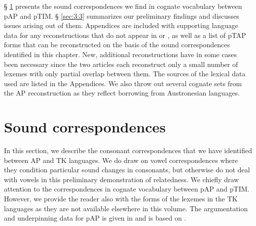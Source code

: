 {\S} \ref{sec:3:2} presents the sound correspondences we find in cognate vocabulary between pAP and pTIM. {\S} \ref{sec:3:3} summarizes our preliminary findings and discusses issues arising out of them.  Appendices are included with supporting language data for any reconstructions that do not appear in \citet{HoltonEtAl2012} or \citet{SchapperEtAl2012}, as well as a list of pTAP forms that can be reconstructed on the basis of the sound correspondences identified in this chapter. New, additional reconstructions have in some cases been necessary since the two articles each reconstruct only a small number of lexemes with only partial overlap between them.  The sources of the lexical data used are listed in the Appendices. We also throw out several cognate sets from the AP reconstruction as they reflect borrowing from Austronesian languages. 

\section{Sound correspondences}\label{sec:3:2}
In this section, we describe the consonant correspondences that we have identified between AP and TK languages. We do draw on vowel correspondences where they condition particular sound changes in consonants, but otherwise do not deal with vowels in this preliminary demonstration of relatedness. We chiefly draw attention to the correspondences in cognate vocabulary between pAP and pTIM. However, we provide the reader also with the forms of the lexemes in the TK languages as they are not available elsewhere in this volume. The argumentation and underpinning data for pAP is given in \citet{HoltonRobinsonTVhistory} and is based on \citet{HoltonEtAl2012}.

